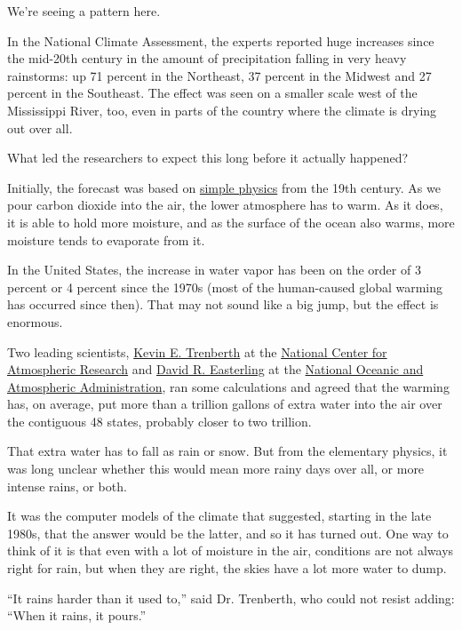 We're seeing a pattern here.

In the National Climate Assessment, the experts reported huge increases
since the mid-20th century in the amount of precipitation falling in
very heavy rainstorms: up 71 percent in the Northeast, 37 percent in the
Midwest and 27 percent in the Southeast. The effect was seen on a
smaller scale west of the Mississippi River, too, even in parts of the
country where the climate is drying out over all.

What led the researchers to expect this long before it actually
happened?

Initially, the forecast was based on
\href{http://tinyurl.com/latnp6g}{simple physics} from the 19th century.
As we pour carbon dioxide into the air, the lower atmosphere has to
warm. As it does, it is able to hold more moisture, and as the surface
of the ocean also warms, more moisture tends to evaporate from it.

In the United States, the increase in water vapor has been on the order
of 3 percent or 4 percent since the 1970s (most of the human-caused
global warming has occurred since then). That may not sound like a big
jump, but the effect is enormous.

Two leading scientists,
\href{http://www.cgd.ucar.edu/staff/trenbert/}{Kevin E. Trenberth} at
the \href{http://ncar.ucar.edu/}{National Center for Atmospheric
Research} and
\href{http://www.ametsoc.org/boardpges/cwce/docs/profiles/EasterlingDavidR/profile.html}{David
R. Easterling} at the \href{http://www.noaa.gov/}{National Oceanic and
Atmospheric Administration}, ran some calculations and agreed that the
warming has, on average, put more than a trillion gallons of extra water
into the air over the contiguous 48 states, probably closer to two
trillion.

That extra water has to fall as rain or snow. But from the elementary
physics, it was long unclear whether this would mean more rainy days
over all, or more intense rains, or both.

It was the computer models of the climate that suggested, starting in
the late 1980s, that the answer would be the latter, and so it has
turned out. One way to think of it is that even with a lot of moisture
in the air, conditions are not always right for rain, but when they are
right, the skies have a lot more water to dump.

``It rains harder than it used to,'' said Dr. Trenberth, who could not
resist adding: ``When it rains, it pours.''

